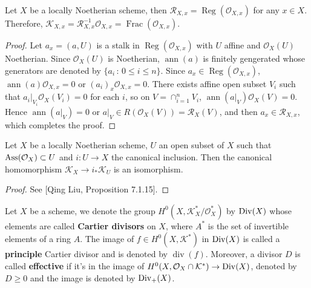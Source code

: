 \begin{lem}
Let $X$ be a locally Noetherian scheme, then 
$\mathcal R_{X,x}=\operatorname{Reg}(\mathcal O_{X,x})$ 
for any $x\in X$. Therefore, $\mathcal K_{X,x}=\mathcal R_{X,x}^{-1}\mathcal O_{X,x}
=\operatorname{Frac}(\mathcal O_{X,x})$.
\end{lem}

\begin{proof}
Let $a_x=(a,U)$ is a stalk in $\operatorname{Reg}(\mathcal O_{X,x})$ with
$U$ affine and $\mathcal O_X(U)$ Noetherian. 
Since $\mathcal O_X(U)$ is Noetherian, $\operatorname{ann}(a)$
is finitely gengerated whose generators are denoted by $\{a_i\,:\,0\leq i\leq n\}$.
Since $a_x\in \operatorname{Reg}(\mathcal O_{X,x})$, 
$\operatorname{ann}(a)\mathcal O_{X,x}=0$ or $(a_i)_x\mathcal O_{X,x}=0$. There exists
affine open subset $V_i$ such that $a_i|_{V_i}\mathcal O_X(V_i)=0$ for each $i$, so on
$V=\cap_{i=1}^n V_i$, $\operatorname{ann}(a|_V)\mathcal O_X(V)=0$. Hence 
$\operatorname{ann}(a|_V)=0$ or 
$a|_V\in R(\mathcal O_X(V))=\mathcal R_X(V)$, and then $a_x\in \mathcal R_{X,x}$,
which completes the proof.
\end{proof}

\begin{pro}
Let $X$ be a locally Noetherian scheme, $U$ an open subset of $X$ such that 
$\operatorname{Ass}(\mathcal O_X)\subset U$ and 
$i:U\to X$ the canonical inclusion. Then the canonical homomorphism 
$\mathcal K_X\to i_*\mathcal K_U$ is an isomorphism.
\end{pro}

\begin{proof}
	See [Qing Liu, Proposition 7.1.15].
\end{proof}

\begin{defi}
Let $X$ be a scheme, we denote the group $H^0(X,\mathcal K^*_X/
\mathcal O_X^*)$ by $\operatorname{Div}(X)$ whose elements are called \textbf{Cartier divisors}
on $X$, where $A^*$ is the set of invertible elements of a ring $A$.
The image of $f\in H^0(X,\mathcal K^*)$ in $\operatorname{Div}(X)$ is called a \textbf{principle}
Cartier divisor and is denoted by $\operatorname{div}(f)$. Moreover, a divisor
$D$ is called \textbf{effective} if it's in the image of 
$H^0(X,\mathcal O_X\cap \mathcal K^*)\to \operatorname{Div}(X)$, denoted by $D\geq 0$
and the image is denoted by $\operatorname{Div}_+(X)$.
\end{defi}

